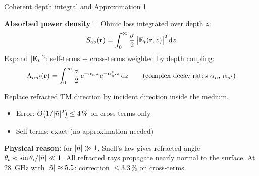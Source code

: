 \begin{frame}[label=app-p3-depth]{Coherent depth integral and Approximation 1}

  {\small
  \textbf{Absorbed power density} = Ohmic loss integrated over depth $z$:
  \[
    S_{\mathrm{ab}}(\mathbf{r}) = \int_0^\infty \frac{\sigma}{2}\,\bigl|\mathbf{E}_t(\mathbf{r},z)\bigr|^2\,\mathrm{d} z
  \]
  \vspace{-2pt}
  Expand $|\mathbf{E}_t|^2$: self-terms + cross-terms weighted by depth coupling:
  \[
    \Lambda_{nn'}(\mathbf{r}) = \int_0^\infty \frac{\sigma}{2}\,
    e^{-\alpha_n z}\,e^{-\alpha_{n'}^* z}\,\mathrm{d} z
    \qquad\text{(complex decay rates $\alpha_n$, $\alpha_{n'}$)}
  \]
  }
  \vspace{-1pt}
  \begin{resultbox}
    \vspace{-4pt}
    {\small Replace refracted TM direction by incident direction inside the medium.}
    \begin{itemize}\setlength\itemsep{0pt}
      \item {\small Error: $O\bigl(1/|\tilde{n}|^2\bigr) \le 4\,\%$ on cross-terms only}
      \item {\small Self-terms: exact (no approximation needed)}
    \end{itemize}
  \end{resultbox}
  \vspace{0pt}
  {\small \textbf{Physical reason:} for $|\tilde{n}| \gg 1$, Snell's law gives refracted angle
  $\theta_t \approx \sin\theta_i / |\tilde{n}| \ll 1$. All refracted rays propagate nearly
  normal to the surface.}
  \vspace{0pt}
  {\footnotesize At \SI{28}{\giga\hertz} with $|\tilde{n}| \approx 5.5$: correction $\le 3.3\,\%$ on cross-terms.}
  \vspace{-2pt}
  \quad{}
\end{frame}

